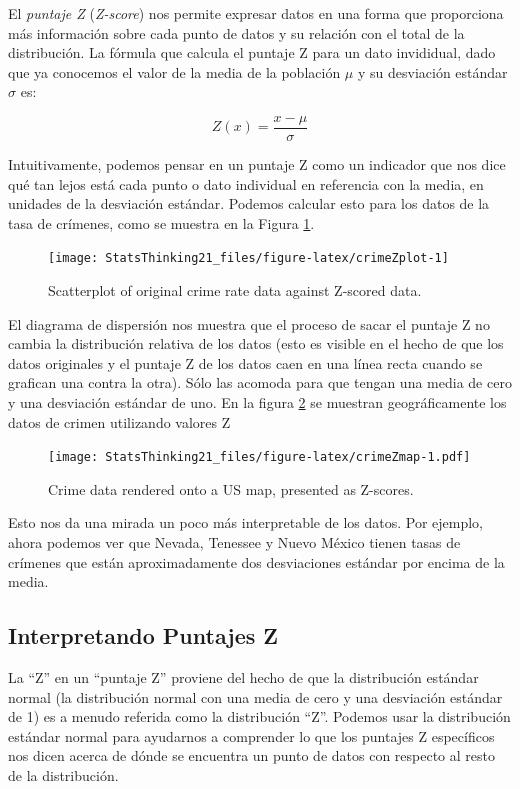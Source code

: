 \documentclass[
  12pt,
]{book}
\begin{document}
El \emph{puntaje Z} (\emph{Z-score}) nos permite expresar datos en una forma que proporciona más información sobre cada punto de datos y su relación con el total de la distribución. La fórmula que calcula el puntaje Z para un dato invididual, dado que ya conocemos el valor de la media de la población \(\mu\) y su desviación estándar \(\sigma\) es:

\[
Z(x) = \frac{x - \mu}{\sigma}
\]

Intuitivamente, podemos pensar en un puntaje Z como un indicador que nos dice qué tan lejos está cada punto o dato individual en referencia con la media, en unidades de la desviación estándar. Podemos calcular esto para los datos de la tasa de crímenes, como se muestra en la Figura \ref{fig:crimeZplot}.

\begin{figure}
\texttt{[image: StatsThinking21\_files/figure-latex/crimeZplot-1]} \caption{Scatterplot of original crime rate data against Z-scored data.}\label{fig:crimeZplot}
\end{figure}

El diagrama de dispersión nos muestra que el proceso de sacar el puntaje Z no cambia la distribución relativa de los datos (esto es visible en el hecho de que los datos originales y el puntaje Z de los datos caen en una línea recta cuando se grafican una contra la otra).
Sólo las acomoda para que tengan una media de cero y una desviación estándar de uno. En la figura \ref{fig:crimeZmap} se muestran geográficamente los datos de crimen utilizando valores Z

\begin{figure}
\centering
\texttt{[image: StatsThinking21\_files/figure-latex/crimeZmap-1.pdf]}
\caption{\label{fig:crimeZmap}Crime data rendered onto a US map, presented as Z-scores.}
\end{figure}

Esto nos da una mirada un poco más interpretable de los datos. Por ejemplo, ahora podemos ver que Nevada, Tenessee y Nuevo México tienen tasas de crímenes que están aproximadamente dos desviaciones estándar por encima de la media.

\hypertarget{interpretando-puntajes-z}{%
\subsection{Interpretando Puntajes Z}\label{interpretando-puntajes-z}}

La ``Z'' en un ``puntaje Z'' proviene del hecho de que la distribución estándar normal (la distribución normal con una media de cero y una desviación estándar de 1) es a menudo referida como la distribución ``Z''. Podemos usar la distribución estándar normal para ayudarnos a comprender lo que los puntajes Z específicos nos dicen acerca de dónde se encuentra un punto de datos con respecto al resto de la distribución.
\end{document}
